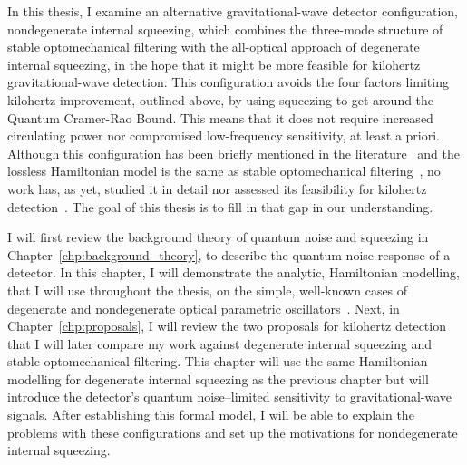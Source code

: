 In this thesis, I examine an alternative gravitational-wave detector configuration, nondegenerate internal squeezing, which combines the three-mode structure of stable optomechanical filtering with the all-optical approach of degenerate internal squeezing, in the hope that it might be more feasible for kilohertz gravitational-wave detection. This configuration avoids the four factors limiting kilohertz improvement, outlined above, by using squeezing to get around the Quantum Cramer-Rao Bound. This means that it does not require increased circulating power nor compromised low-frequency sensitivity, at least a priori. Although this configuration has been briefly mentioned in the literature~\cite{liBroadbandSensitivityImprovement2020} and the lossless Hamiltonian model is the same as stable optomechanical filtering~\cite{liBroadbandSensitivityImprovement2020}, no work has, as yet, studied it in detail nor assessed its feasibility for kilohertz detection~\cite{}. The goal of this thesis is to fill in that gap in our understanding.


I will first review the background theory of quantum noise and squeezing in Chapter~\ref{chp:background_theory}, to describe the quantum noise response of a detector. In this chapter, I will demonstrate the analytic, Hamiltonian modelling, that I will use throughout the thesis, on the simple, well-known cases of degenerate and nondegenerate optical parametric oscillators~\cite{}. Next, in Chapter~\ref{chp:proposals}, I will review the two proposals for kilohertz detection that I will later compare my work against degenerate internal squeezing and stable optomechanical filtering. This chapter will use the same Hamiltonian modelling for degenerate internal squeezing as the previous chapter but will introduce the detector's quantum noise--limited sensitivity to gravitational-wave signals. After establishing this formal model, I will be able to explain the problems with these configurations and set up the motivations for nondegenerate internal squeezing.

